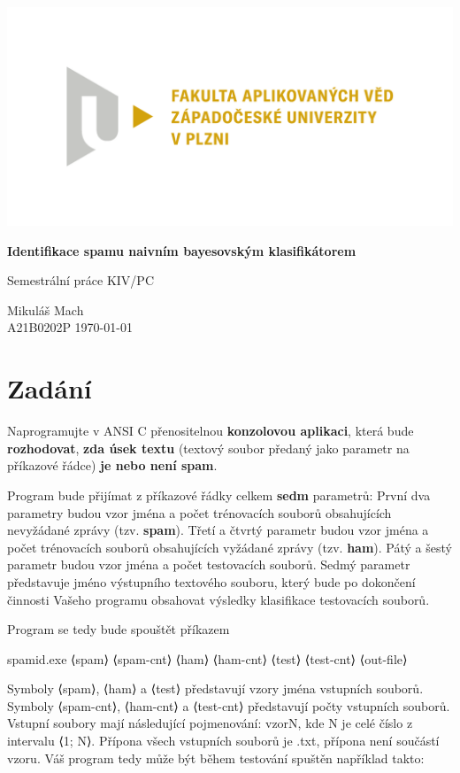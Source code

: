 \documentclass[12pt]{report}
\newcommand\myindent[1]{						
	\setlength\parindent{5mm}
	#1
	\setlength\parindent{0mm}
}
\begin{document}
	
	\begin{titlepage}
		\centering
		\Large
		
		\includegraphics[width=.7\textwidth]{fav}
		
		\vspace{15mm}
		{\Huge\bfseries Identifikace spamu naivním bayesovským klasifikátorem}
		
		\vspace{15mm}
		{\LARGE Semestrální práce KIV/PC}
		
		\vfill
		\raggedright
		Mikuláš Mach\\
		A21B0202P
		\hfill 
		\today
	\end{titlepage}

	\tableofcontents
	
	\chapter{Zadání}
	Naprogramujte v ANSI C přenositelnou \textbf{konzolovou aplikaci}, která bude \textbf{rozhodovat}, \textbf{zda úsek textu} (textový soubor předaný jako parametr na příkazové řádce) \textbf{je nebo není spam}.
	
	Program bude přijímat z příkazové řádky celkem \textbf{sedm} parametrů: První dva parametry budou
	vzor jména a počet trénovacích souborů obsahujících nevyžádané zprávy (tzv. \textbf{spam}). Třetí a
	čtvrtý parametr budou vzor jména a počet trénovacích souborů obsahujících vyžádané zprávy
	(tzv. \textbf{ham}). Pátý a šestý parametr budou vzor jména a počet testovacích souborů. Sedmý parametr představuje jméno výstupního textového souboru, který bude po dokončení činnosti Vašeho
	programu obsahovat výsledky klasifikace testovacích souborů.
	
	Program se tedy bude spouštět příkazem
		
	\myindent{spamid.exe ⟨spam⟩ ⟨spam-cnt⟩ ⟨ham⟩ ⟨ham-cnt⟩ ⟨test⟩ ⟨test-cnt⟩ ⟨out-file⟩}
	
	Symboly ⟨spam⟩, ⟨ham⟩ a ⟨test⟩ představují vzory jména vstupních souborů. Symboly ⟨spam-cnt⟩,
	⟨ham-cnt⟩ a ⟨test-cnt⟩ představují počty vstupních souborů. Vstupní soubory mají následující
	pojmenování: vzorN, kde N je celé číslo z intervalu ⟨1; N⟩. Přípona všech vstupních souborů je
	.txt, přípona není součástí vzoru. Váš program tedy může být během testování spuštěn například
	takto:
	
\end{document}
